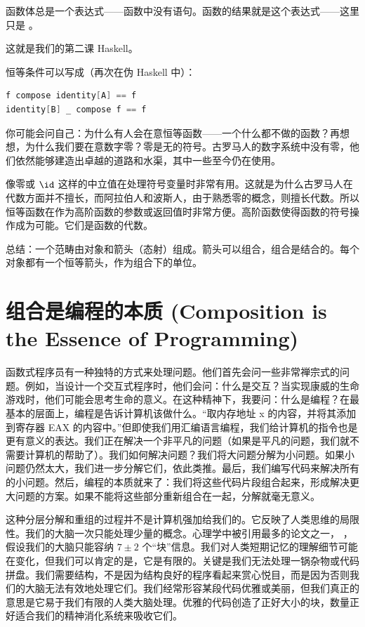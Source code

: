 函数体总是一个表达式——函数中没有语句。函数的结果就是这个表达式——这里只是 。

这就是我们的第二课 Haskell。

恒等条件可以写成（再次在伪 Haskell 中）：

\begin{lstlisting}[language=Scala]
f compose identity[A] == f
identity[B] _ compose f == f
\end{lstlisting}
你可能会问自己：为什么有人会在意恒等函数——一个什么都不做的函数？再想想，为什么我们要在意数字零？零是无的符号。古罗马人的数字系统中没有零，他们依然能够建造出卓越的道路和水渠，其中一些至今仍在使用。

像零或 $\id$ 这样的中立值在处理符号变量时非常有用。这就是为什么古罗马人在代数方面并不擅长，而阿拉伯人和波斯人，由于熟悉零的概念，则擅长代数。所以恒等函数在作为高阶函数的参数或返回值时非常方便。高阶函数使得函数的符号操作成为可能。它们是函数的代数。

总结：一个范畴由对象和箭头（态射）组成。箭头可以组合，组合是结合的。每个对象都有一个恒等箭头，作为组合下的单位。

\section{组合是编程的本质 (Composition is the Essence of Programming)}

函数式程序员有一种独特的方式来处理问题。他们首先会问一些非常禅宗式的问题。例如，当设计一个交互式程序时，他们会问：什么是交互？当实现康威的生命游戏时，他们可能会思考生命的意义。在这种精神下，我要问：什么是编程？在最基本的层面上，编程是告诉计算机该做什么。“取内存地址 x 的内容，并将其添加到寄存器 EAX 的内容中。”但即使我们用汇编语言编程，我们给计算机的指令也是更有意义的表达。我们正在解决一个非平凡的问题（如果是平凡的问题，我们就不需要计算机的帮助了）。我们如何解决问题？我们将大问题分解为小问题。如果小问题仍然太大，我们进一步分解它们，依此类推。最后，我们编写代码来解决所有的小问题。然后，编程的本质就来了：我们将这些代码片段组合起来，形成解决更大问题的方案。如果不能将这些部分重新组合在一起，分解就毫无意义。

这种分层分解和重组的过程并不是计算机强加给我们的。它反映了人类思维的局限性。我们的大脑一次只能处理少量的概念。心理学中被引用最多的论文之一，
，假设我们的大脑只能容纳 $7 \pm 2$ 个“块”信息。我们对人类短期记忆的理解细节可能在变化，但我们可以肯定的是，它是有限的。关键是我们无法处理一锅杂物或代码拼盘。我们需要结构，不是因为结构良好的程序看起来赏心悦目，而是因为否则我们的大脑无法有效地处理它们。我们经常形容某段代码优雅或美丽，但我们真正的意思是它易于我们有限的人类大脑处理。优雅的代码创造了正好大小的块，数量正好适合我们的精神消化系统来吸收它们。

